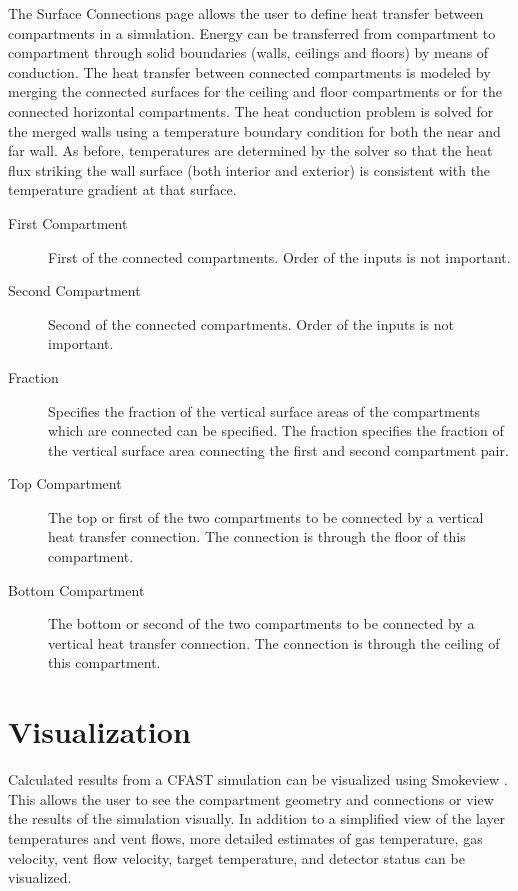 The Surface Connections page allows the user to define heat transfer between compartments in a simulation. Energy can be transferred from compartment to compartment through solid boundaries (walls, ceilings and floors) by means of conduction. The heat transfer between connected compartments is modeled by merging the connected surfaces for the ceiling and floor compartments or for the connected horizontal compartments.  The heat conduction problem is solved for the merged walls using a temperature boundary condition for both the near and far wall. As before, temperatures are determined by the solver so that the heat flux striking the wall surface (both interior and exterior) is consistent with the temperature gradient at that surface.

\begin{description}
\item[First Compartment] First of the connected compartments. Order of the inputs is not important.

\item[Second Compartment] Second of the connected compartments. Order of the inputs is not important.

\item[Fraction] Specifies the fraction of the vertical surface areas of the compartments which are connected can be specified. The fraction specifies the fraction of the vertical surface area connecting the first and second compartment pair.

\item[Top Compartment] The top or first of the two compartments to be connected by a vertical heat transfer connection. The connection is through the floor of this compartment.

\item[Bottom Compartment] The bottom or second of the two compartments to be connected by a vertical heat transfer connection. The connection is through the ceiling of this compartment.
\end{description}



\chapter{Visualization}

Calculated results from a CFAST simulation can be visualized using Smokeview \cite{Smokeview_Users_Guide_6}. This allows the user to see the compartment geometry and connections or view the results of the simulation visually. In addition to a simplified view of the layer temperatures and vent flows, more detailed estimates of gas temperature, gas velocity, vent flow velocity, target temperature, and detector status can be visualized.

